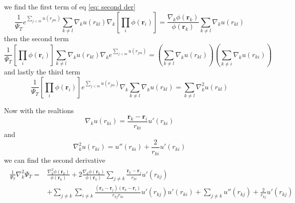 \documentclass[a4paper, 10pt, english]{revtex4-2} %
\begin{document}
        we find the first term of eq \ref*{eq: second der}
        \begin{equation}
                \frac{1}{\Psi_T} e^{\sum_{j<m} u(r_{jm})} \sum_{k\neq l}\nabla_k u(r_{kl}) \nabla_k \left[\prod_i\phi(\mathbf{r}_i)\right]
            =   \frac{\nabla_k \phi(\mathbf{r}_k)}{\phi(\mathbf{r}_k)} \sum_{k\neq l}\nabla_k u(r_{kl})
        \end{equation}
        then the second term
        \begin{equation}
                \frac{1}{\Psi_T}\left[\prod_i\phi(\mathbf{r}_i)\right] \sum_{k\neq l}\nabla_k u(r_{kl}) \nabla_k e^{\sum_{j<m} u(r_{jm})}
            =   \left(\sum_{k\neq l}\nabla_k u(r_{kl})\right) \left(\sum_{k\neq i}\nabla_k u(r_{ki})\right)
        \end{equation}
        and lastly the third term
        \begin{equation}
                \frac{1}{\Psi_T}\left[\prod_i\phi(\mathbf{r}_i)\right] e^{\sum_{j<m} u(r_{jm})} \nabla_k \sum_{k\neq l}\nabla_k u(r_{kl})
            =   \sum_{k\neq l} \nabla_k^2 u(r_{kl})
        \end{equation}

        Now with the realtions
        \begin{equation}
                \nabla_k u(r_{ki})
            =   \frac{\mathbf{r}_k - \mathbf{r}_i}{r_{ki}}u'(r_{ki})
        \end{equation}
        and
        \begin{equation}
                \nabla_k^2 u(r_{ki})
            =   u''(r_{ki}) + \frac{2}{r_{ki}}u'(r_{ki})
        \end{equation}
        we can find the second derivative
        \begin{align}
        \begin{split}
                \frac{1}{\Psi_T} \nabla_k^2 \Psi_T
            =   &\frac{\nabla_k^2 \phi(\mathbf{r}_k)}{\phi(\mathbf{r}_k)} 
                + 2\frac{\nabla_k \phi(\mathbf{r}_k)}{\phi(\mathbf{r}_k)} \sum_{j \neq k} \frac{\mathbf{r}_k - \mathbf{r}_j}{r_{kl}}u'(r_{kj}) \\
                &+ \sum_{j \neq k}\sum_{i \neq k} \frac{(\mathbf{r}_k - \mathbf{r}_j)(\mathbf{r}_k - \mathbf{r}_i)}{r_{kj}r_{ki}}u'(r_{kj})u'(r_{ki})
                + \sum_{j \neq k} u''(r_{kj}) + \frac{2}{r_{kj}}u'(r_{kj})
        \end{split}
        \label{eq: doubleder}
        \end{align}
\end{document}

